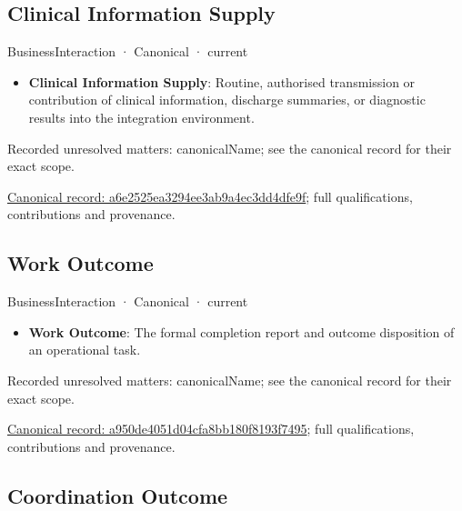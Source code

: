 \subsection{Clinical Information Supply}

\label{element:a6e2525ea3294ee3ab9a4ec3dd4dfe9f}
{\small BusinessInteraction · Canonical · current}\par

\begin{itemize}


\item \textbf{Clinical Information Supply}: Routine, authorised transmission or contribution of clinical information, discharge summaries, or diagnostic results into the integration environment.

\end{itemize}

{\small Recorded unresolved matters: canonicalName; see the canonical record for their exact scope.}\par
{\footnotesize \href{../../../../continuum/business/business-interaction/a6e2525ea3294ee3ab9a4ec3dd4dfe9f.md}{Canonical record: a6e2525ea3294ee3ab9a4ec3dd4dfe9f}; full qualifications, contributions and provenance.}\par
\subsection{Work Outcome}

\label{element:a950de4051d04cfa8bb180f8193f7495}
{\small BusinessInteraction · Canonical · current}\par

\begin{itemize}


\item \textbf{Work Outcome}: The formal completion report and outcome disposition of an operational task.

\end{itemize}

{\small Recorded unresolved matters: canonicalName; see the canonical record for their exact scope.}\par
{\footnotesize \href{../../../../continuum/business/business-interaction/a950de4051d04cfa8bb180f8193f7495.md}{Canonical record: a950de4051d04cfa8bb180f8193f7495}; full qualifications, contributions and provenance.}\par
\subsection{Coordination Outcome}

